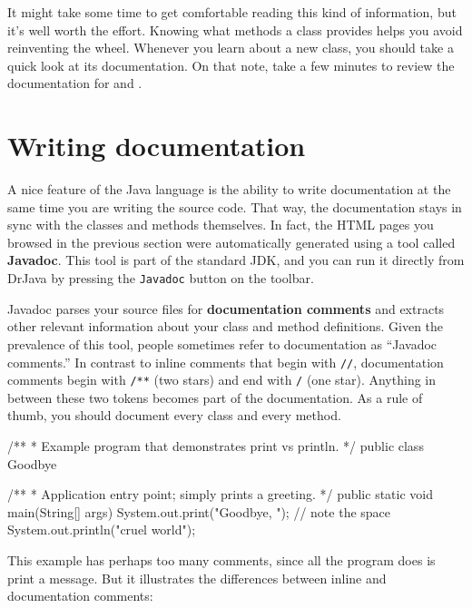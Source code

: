 It might take some time to get comfortable reading this kind of information, but it's well worth the effort.
Knowing what methods a class provides helps you avoid reinventing the wheel.
Whenever you learn about a new class, you should take a quick look at its documentation.
On that note, take a few minutes to review the documentation for  and .


\section{Writing documentation}


A nice feature of the Java language is the ability to write documentation at the same time you are writing the source code.
That way, the documentation stays in sync with the classes and methods themselves.
In fact, the HTML pages you browsed in the previous section were automatically generated using a tool called {\bf Javadoc}.
This tool is part of the standard JDK, and you can run it directly from DrJava by pressing the {\tt Javadoc} button on the toolbar.


Javadoc parses your source files for {\bf documentation comments} and extracts other relevant information about your class and method definitions.
Given the prevalence of this tool, people sometimes refer to documentation as ``Javadoc comments.''
In contrast to inline comments that begin with {\tt //}, documentation comments begin with {\tt /**} (two stars) and end with {\tt */} (one star).
Anything in between these two tokens becomes part of the documentation.
As a rule of thumb, you should document every class and every method.

\begin{code}
/**
 * Example program that demonstrates print vs println.
 */
public class Goodbye {

    /**
     * Application entry point; simply prints a greeting.
     */
    public static void main(String[] args) {
        System.out.print("Goodbye, ");  // note the space
        System.out.println("cruel world");
    }

}
\end{code}

This example has perhaps too many comments, since all the program does is print a message.
But it illustrates the differences between inline and documentation comments:

